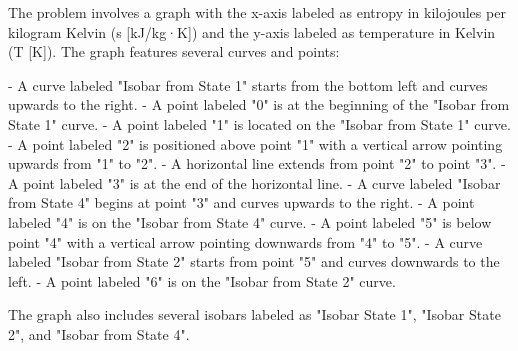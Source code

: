 The problem involves a graph with the x-axis labeled as entropy in kilojoules per kilogram Kelvin (s [kJ/kg·K]) and the y-axis labeled as temperature in Kelvin (T [K]). The graph features several curves and points:

- A curve labeled "Isobar from State 1" starts from the bottom left and curves upwards to the right.
- A point labeled "0" is at the beginning of the "Isobar from State 1" curve.
- A point labeled "1" is located on the "Isobar from State 1" curve.
- A point labeled "2" is positioned above point "1" with a vertical arrow pointing upwards from "1" to "2".
- A horizontal line extends from point "2" to point "3".
- A point labeled "3" is at the end of the horizontal line.
- A curve labeled "Isobar from State 4" begins at point "3" and curves upwards to the right.
- A point labeled "4" is on the "Isobar from State 4" curve.
- A point labeled "5" is below point "4" with a vertical arrow pointing downwards from "4" to "5".
- A curve labeled "Isobar from State 2" starts from point "5" and curves downwards to the left.
- A point labeled "6" is on the "Isobar from State 2" curve.

The graph also includes several isobars labeled as "Isobar State 1", "Isobar State 2", and "Isobar from State 4".